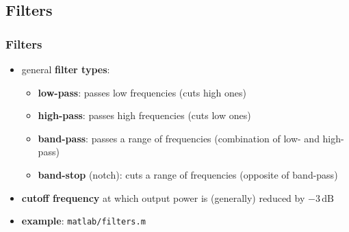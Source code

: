 
\subsection{Filters}

\begin{frame} %
	\frametitle{Filters}
	\begin{itemize}
		\item general \textbf{filter types}:
			\begin{itemize}
				\item \textbf{low-pass}: passes low frequencies (cuts high ones)
				\item \textbf{high-pass}: passes high frequencies (cuts low ones)
				\item \textbf{band-pass}: passes a range of frequencies (combination of low- and high-pass)
				\item \textbf{band-stop} (notch): cuts a range of frequencies (opposite of band-pass)
			\end{itemize}
		\item \textbf{cutoff frequency} at which output power is (generally) reduced by $-3\,\textrm{dB}$
		\item \textbf{example}: \texttt{matlab/filters.m}
			\begin{figure}
				\centering
				\begin{subfigure}[c]{0.48\linewidth}
				\end{subfigure}
				\hspace{0.01\linewidth}
				\begin{subfigure}[c]{0.48\linewidth}
				\end{subfigure}
			\end{figure}
	\end{itemize}
\end{frame}

